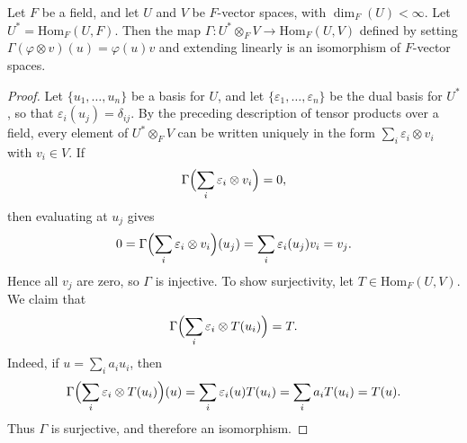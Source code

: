 \documentclass[../Odyssey_Project.tex]{subfiles}
\begin{document}
\begin{proposition}
\label{prop:12.4}
Let $F$ be a field, and let $U$ and $V$ be $F$-vector spaces, with $\dim_F(U) < \infty$. Let $U^* = \mathrm{Hom}_F(U, F)$. Then the map $\Gamma \colon U^* \otimes_F V \to \mathrm{Hom}_F(U, V)$ defined by setting $\Gamma(\varphi \otimes v)(u) = \varphi(u)v$ and extending linearly is an isomorphism of $F$-vector spaces.
\end{proposition}
\begin{proof}
    Let $\{u_1,\ldots,u_n\}$ be a basis for $U$, and let $\{\varepsilon_1,\ldots,\varepsilon_n\}$ be the dual basis for $U^*$, so that $\varepsilon_i(u_j) = \delta_{ij}$. By the preceding description of tensor products over a field, every element of $U^* \otimes_F V$ can be written uniquely in the form $\sum_i \varepsilon_i \otimes v_i$ with $v_i \in V$. If
    \[
        \Gamma\Bigl(\sum_i \varepsilon_i \otimes v_i\Bigr) = 0,
    \]
    then evaluating at $u_j$ gives
    \[
        0 = \Gamma\Bigl(\sum_i \varepsilon_i \otimes v_i\Bigr)(u_j) = \sum_i \varepsilon_i(u_j)v_i = v_j.
    \]
    Hence all $v_j$ are zero, so $\Gamma$ is injective. To show surjectivity, let $T \in \mathrm{Hom}_F(U,V)$. We claim that
    \[
        \Gamma\Bigl(\sum_i \varepsilon_i \otimes T(u_i)\Bigr) = T.
    \]
    Indeed, if $u = \sum_i a_i u_i$, then
    \[
        \Gamma\Bigl(\sum_i \varepsilon_i \otimes T(u_i)\Bigr)(u)
        = \sum_i \varepsilon_i(u)T(u_i)
        = \sum_i a_iT(u_i)
        = T(u).
    \]
    Thus $\Gamma$ is surjective, and therefore an isomorphism.
\end{proof}
\end{document}
